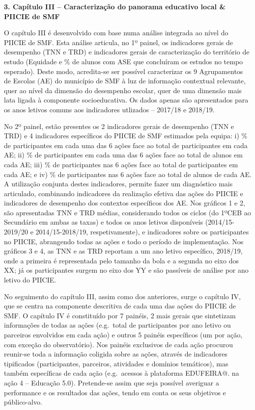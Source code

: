 \documentclass[
]{book}
\begin{document}
\textbf{3. Capítulo III -- Caracterização do panorama educativo local \& PIICIE de SMF}

O capítulo III é desenvolvido com base numa análise integrada ao nível do PIICIE de SMF. Esta análise articula, no 1º painel, os indicadores gerais de desempenho (TNN e TRD) e indicadores gerais de caracterização do território de estudo (Equidade e \% de alunos com ASE que concluíram os estudos no tempo esperado). Deste modo, acredita-se ser possível caracterizar os 9 Agrupamentos de Escolas (AE) do município de SMF à luz de informação contextual relevante, quer ao nível da dimensão do desempenho escolar, quer de uma dimensão mais lata ligada à componente socioeducativa. Os dados apenas são apresentados para os anos letivos comuns aos indicadores utlizados -- 2017/18 e 2018/19.

No 2º painel, estão presentes os 2 indicadores gerais de desempenho (TNN e TRD) e 4 indicadores específicos do PIICIE de SMF estimados pela equipa: i) \% de participantes em cada uma das 6 ações face ao total de participantes em cada AE; ii) \% de participantes em cada uma das 6 ações face ao total de alunos em cada AE; iii) \% de participantes nas 6 ações face ao total de participantes em cada AE; e iv) \% de participantes nas 6 ações face ao total de alunos de cada AE. A utilização conjunta destes indicadores, permite fazer um diagnóstico mais articulado, combinando indicadores da realização efetiva das ações do PIICIE e indicadores de desempenho dos contextos específicos dos AE. Nos gráficos 1 e 2, são apresentadas TNN e TRD médias, considerando todos os ciclos (do 1ºCEB ao Secundário em ambas as taxas) e todos os anos letivos disponíveis (2014/15-2019/20 e 2014/15-2018/19, respetivamente), e indicadores sobre os participantes no PIICIE, abrangendo todas as ações e todo o período de implementação. Nos gráficos 3 e 4, as TNN e as TRD reportam a um ano letivo específico, 2018/19, onde a primeira é representada pelo tamanho da bola e a segunda no eixo dos XX; já os participantes surgem no eixo dos YY e são passíveis de análise por ano letivo do PIICIE.

No seguimento do capítulo III, assim como dos anteriores, surge o capítulo IV, que se centra na componente descritiva de cada uma das ações do PIICIE de SMF. O capítulo IV é constituído por 7 painéis, 2 mais gerais que sintetizam informações de todas as ações (e.g.~total de participantes por ano letivo ou parceiros envolvidos em cada ação) e outros 5 painéis específicos (um por ação, com exceção do observatório). Nos painéis exclusivos de cada ação procurou reunir-se toda a informação coligida sobre as ações, através de indicadores tipificados (participantes, parceiros, atividades e domínios temáticos), mas também específicas de cada ação (e.g.~acessos à plataforma EDUFEIRA@. na ação 4 -- Educação 5.0). Pretende-se assim que seja possível averiguar a performance e os resultados das ações, tendo em conta os seus objetivos e público-alvo.
\end{document}
